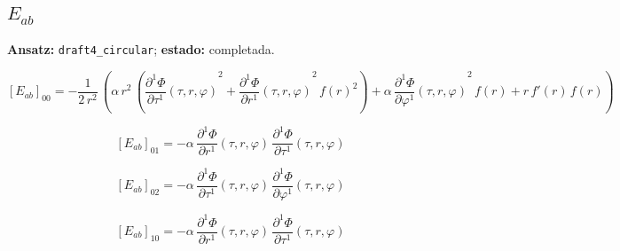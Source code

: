 \documentclass[11pt]{article}
\begin{document}
\subsection*{$ E_{ab} $}
\textbf{Ansatz:} \texttt{draft4\_circular}; \textbf{estado:} completada.\par
\begin{dmath*}[breakdepth={5}]
\left[E_{ab}\right]_{00} = -\frac{1}{2\,{r}^{2}}\,\left(\alpha\,{r}^{2}\,\left({\frac{\partial^{1} \Phi}{\partial \tau^{1}}\!\left(\tau, r, \varphi\right)}^{2} + {\frac{\partial^{1} \Phi}{\partial r^{1}}\!\left(\tau, r, \varphi\right)}^{2}\,{f\!\left(r\right)}^{2}\right) + \alpha\,{\frac{\partial^{1} \Phi}{\partial \varphi^{1}}\!\left(\tau, r, \varphi\right)}^{2}\,f\!\left(r\right) + r\,f'\!\left(r\right)\,f\!\left(r\right)\right)
\end{dmath*}
\par\smallskip
\begin{dmath*}[breakdepth={5}]
\left[E_{ab}\right]_{01} = -\alpha\,\frac{\partial^{1} \Phi}{\partial r^{1}}\!\left(\tau, r, \varphi\right)\,\frac{\partial^{1} \Phi}{\partial \tau^{1}}\!\left(\tau, r, \varphi\right)
\end{dmath*}
\par\smallskip
\begin{dmath*}[breakdepth={5}]
\left[E_{ab}\right]_{02} = -\alpha\,\frac{\partial^{1} \Phi}{\partial \tau^{1}}\!\left(\tau, r, \varphi\right)\,\frac{\partial^{1} \Phi}{\partial \varphi^{1}}\!\left(\tau, r, \varphi\right)
\end{dmath*}
\par\smallskip
\begin{dmath*}[breakdepth={5}]
\left[E_{ab}\right]_{10} = -\alpha\,\frac{\partial^{1} \Phi}{\partial r^{1}}\!\left(\tau, r, \varphi\right)\,\frac{\partial^{1} \Phi}{\partial \tau^{1}}\!\left(\tau, r, \varphi\right)
\end{dmath*}
\par\smallskip
\end{document}
